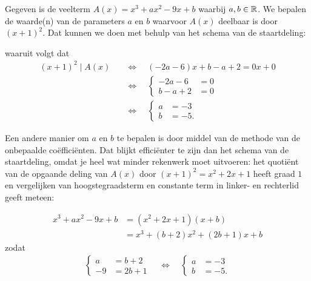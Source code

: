\documentclass{ximera}
\begin{document}
	\begin{example} 
	Gegeven is de veelterm $A(x) = x^3 + ax^2 - 9x + b$ waarbij $a,b \in \mathbb{R}$. We bepalen de waarde(n) van de parameters $a$ en $b$ waarvoor $A(x)$ deelbaar is door $(x+1)^2$. Dat kunnen we doen met behulp van het schema van de staartdeling:

	waaruit volgt dat  
	\begin{align*}
	(x+1)^2 \mid A(x) \quad 
	& \Leftrightarrow \quad (-2a-6)x+b-a+2 = 0x + 0 \\
	& \Leftrightarrow \quad
	\left\{ 
	\begin{aligned}
	-2a-6 & = 0 \\
	b-a+2 & = 0 
	\end{aligned}
	\right. \\ 
	& \Leftrightarrow \quad
	\left\{ 
	\begin{aligned}
	a & = -3 \\
	b & = -5. 
	\end{aligned}
	\right.
	\end{align*} 

	Een andere manier om $a$ en $b$ te bepalen is door middel van de methode van de onbepaalde coëfficiënten. Dat blijkt efficiënter te zijn dan het schema van de staartdeling, omdat je heel wat minder rekenwerk moet uitvoeren: het quotiënt van de opgaande deling van $A(x)$ door $(x+1)^2 = x^2 + 2x + 1$ heeft graad $1$ en vergelijken van hoogstegraadsterm en constante term in linker- en rechterlid geeft meteen:

	\begin{align*}
	x^3 + ax^2 - 9x + b 
	& = (x^2 + 2x + 1)(x + b) \\
	& = x^3 + (b+2)x^2 + (2b+1)x + b
	\end{align*}
	zodat 
	\begin{align*}
	\left\{ 
	\begin{aligned}
	a & = b+2 \\
	-9 & = 2b+1
	\end{aligned}
	\right. 
	\quad \Leftrightarrow \quad
	\left\{ 
	\begin{aligned}
	a & = -3 \\
	b & = -5. 
	\end{aligned}
	\right.
	\end{align*}
	\end{example} 
	
	
\end{document}
